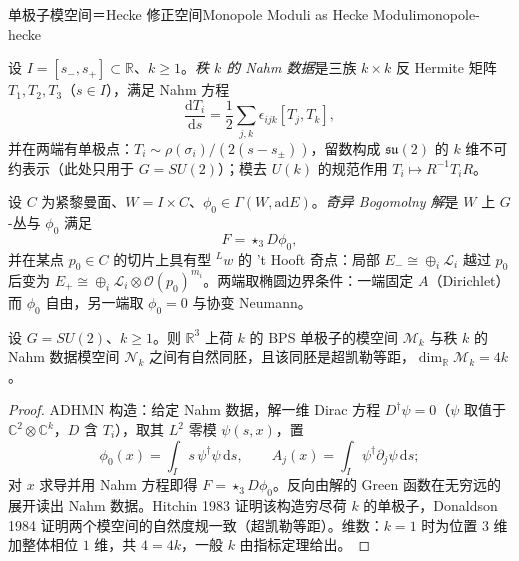 \begin{centry}{单极子模空间＝Hecke 修正空间}{Monopole Moduli as Hecke Moduli}{monopole-hecke}

\begin{definition}
设 $I=[s_{-},s_{+}]\subset\mathbb{R}$、$k\ge1$。\emph{秩 $k$ 的 Nahm 数据}是三族 $k\times k$ 反 Hermite 矩阵 $T_1,T_2,T_3$（$s\in I$），满足 Nahm 方程
\[
\frac{\mathrm{d}T_i}{\mathrm{d}s}=\frac12\sum_{j,k}\epsilon_{ijk}[T_j,T_k],
\]
并在两端有单极点：$T_i\sim\rho(\sigma_i)/(2(s-s_{\pm}))$，留数构成 $\mathfrak{su}(2)$ 的 $k$ 维不可约表示（此处只用于 $G=SU(2)$）；模去 $U(k)$ 的规范作用 $T_i\mapsto R^{-1}T_iR$。

设 $C$ 为紧黎曼面、$W=I\times C$、$\phi_0\in\Gamma(W,\mathrm{ad}E)$。\emph{奇异 Bogomolny 解}是 $W$ 上 $G$-丛与 $\phi_0$ 满足
\[
F=\star_3D\phi_0 ,
\]
并在某点 $p_0\in C$ 的切片上具有型 ${}^{L}w$ 的 't Hooft 奇点：局部 $E_{-}\cong\oplus_i\mathcal{L}_i$ 越过 $p_0$ 后变为 $E_{+}\cong\oplus_i\mathcal{L}_i\otimes\mathcal{O}(p_0)^{m_i}$。两端取椭圆边界条件：一端固定 $A$（Dirichlet）而 $\phi_0$ 自由，另一端取 $\phi_0=0$ 与协变 Neumann。
\end{definition}

\begin{theorem}[ADHMN 对应]
设 $G=SU(2)$、$k\ge1$。则 $\mathbb{R}^{3}$ 上荷 $k$ 的 BPS 单极子的模空间 $\mathcal{M}_k$ 与秩 $k$ 的 Nahm 数据模空间 $\mathcal{N}_k$ 之间有自然同胚，且该同胚是超凯勒等距，$\dim_{\mathbb{R}}\mathcal{M}_k=4k$。
\end{theorem}
\begin{proof}
ADHMN 构造：给定 Nahm 数据，解一维 Dirac 方程 $D^{\dagger}\psi=0$（$\psi$ 取值于 $\mathbb{C}^{2}\otimes\mathbb{C}^{k}$，$D$ 含 $T_i$），取其 $L^{2}$ 零模 $\psi(s,x)$，置
\[
\phi_0(x)=\int_I s\,\psi^{\dagger}\psi\,\mathrm{d}s,\qquad A_j(x)=\int_I\psi^{\dagger}\partial_j\psi\,\mathrm{d}s ;
\]
对 $x$ 求导并用 Nahm 方程即得 $F=\star_3D\phi_0$。反向由解的 Green 函数在无穷远的展开读出 Nahm 数据。Hitchin 1983 证明该构造穷尽荷 $k$ 的单极子，Donaldson 1984 证明两个模空间的自然度规一致（超凯勒等距）。维数：$k=1$ 时为位置 $3$ 维加整体相位 $1$ 维，共 $4=4k$，一般 $k$ 由指标定理给出。
\end{proof}


\end{centry}
